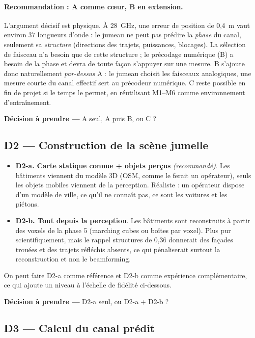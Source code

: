 \documentclass[11pt,a4paper]{article}
\newcommand{\decision}[1]{%
  \par\smallskip\noindent\colorbox{tabchoice}{\parbox{\dimexpr\linewidth-2\fboxsep}{\small\textbf{Décision à prendre --- }#1}}\par\smallskip}
\begin{document}
\paragraph{Recommandation : A comme c\oe ur, B en extension.}
L'argument décisif est physique. À 28~GHz, une erreur de position de 0,4~m vaut environ 37
longueurs d'onde : le jumeau ne peut pas prédire la \emph{phase} du canal, seulement sa
\emph{structure} (directions des trajets, puissances, blocages). La sélection de faisceau n'a
besoin que de cette structure ; le précodage numérique (B) a besoin de la phase et devra de toute
façon s'appuyer sur une mesure. B s'ajoute donc naturellement \emph{par-dessus} A : le jumeau
choisit les faisceaux analogiques, une mesure courte du canal effectif sert au précodeur
numérique. C reste possible en fin de projet si le temps le permet, en réutilisant M1--M6 comme
environnement d'entraînement.

\decision{A seul, A puis B, ou C ?}

\subsection{D2 --- Construction de la scène jumelle}

\begin{itemize}
  \item \textbf{D2-a. Carte statique connue + objets perçus} \emph{(recommandé)}. Les bâtiments
        viennent du modèle 3D (OSM, comme le ferait un opérateur), seuls les objets mobiles
        viennent de la perception. Réaliste : un opérateur dispose d'un modèle de ville, ce qu'il
        ne connaît pas, ce sont les voitures et les piétons.
  \item \textbf{D2-b. Tout depuis la perception}. Les bâtiments sont reconstruits à partir des
        voxels de la phase 5 (marching cubes ou boîtes par voxel). Plus pur scientifiquement, mais
        le rappel structures de 0,36 donnerait des façades trouées et des trajets réfléchis
        absents, ce qui pénaliserait surtout la reconstruction et non le beamforming.
\end{itemize}
On peut faire D2-a comme référence et D2-b comme expérience complémentaire, ce qui ajoute un
niveau à l'échelle de fidélité ci-dessous.

\decision{D2-a seul, ou D2-a + D2-b ?}

\subsection{D3 --- Calcul du canal prédit}
\end{document}
